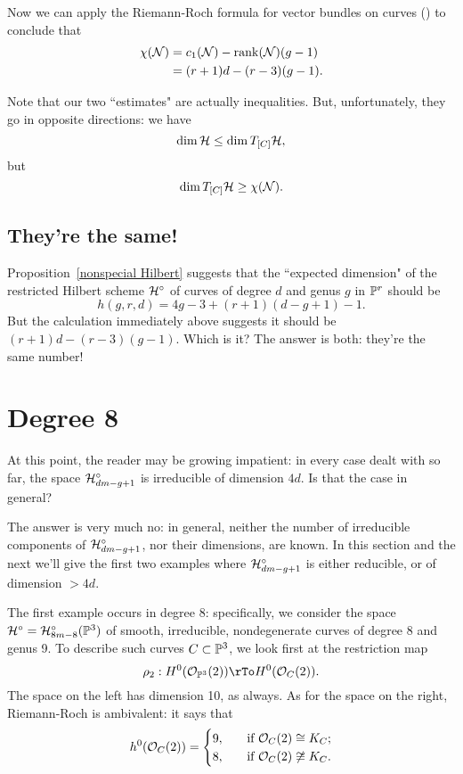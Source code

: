 Now we can apply the Riemann-Roch formula for vector bundles on curves (\cite{3264}) to conclude that
\begin{align*}
\chi(\cN) &= c_1(\cN) - \rank(\cN)(g-1) \\
&= (r+1)d - (r-3)(g-1).
\end{align*}

Note that our two ``estimates" are actually inequalities. But, unfortunately, they go in opposite directions: we have
$$
\dim \cH \leq \dim T_{[C]}\cH,
$$
but 
$$
\dim T_{[C]}\cH \geq \chi(\cN).
$$


\subsection{They're the same!} Proposition~\ref{nonspecial Hilbert} suggests that the ``expected dimension" of the restricted Hilbert scheme $\cH^\circ$ of curves of degree $d$ and genus $g$ in $\PP^r$ should be 
$$
h(g,r,d) = 4g-3 + (r+1)(d-g+1) - 1.
$$
But the calculation immediately above suggests it should be $(r+1)d - (r-3)(g-1)$. Which is it? The answer is both: they're the same number!

\section{Degree 8}

At this point, the reader may be growing impatient: in every case dealt with so far, the space $\cH^\circ_{dm-g+1}$ is irreducible of dimension $4d$. Is that the case in general?

The answer is very much no: in general, neither the number of irreducible components of $\cH^\circ_{dm-g+1}$, nor their dimensions, are known. In this section and the next we'll give the first two examples where $\cH^\circ_{dm-g+1}$ is either reducible, or of dimension $>4d$.

The first example occurs in degree 8: specifically, we consider the space $\cH^\circ = \cH^\circ_{8m-8}(\PP^3)$ of smooth, irreducible, nondegenerate curves of degree 8 and genus 9. To describe such curves $C \subset \PP^3$, we look first at the restriction map
$$
\rho_2 : H^0(\cO_{\PP^3}(2)) \rTo H^0(\cO_C(2)).
$$
The space on the left has dimension 10, as always. As for the space on the right, Riemann-Roch is ambivalent: it says that
\begin{align*}
h^0(\cO_C(2)) =
\begin{cases}
9, \quad &\text{if } \cO_C(2) \cong K_C; \\
8,  \quad &\text{if } \cO_C(2) \not\cong K_C.
\end{cases}
\end{align*}

